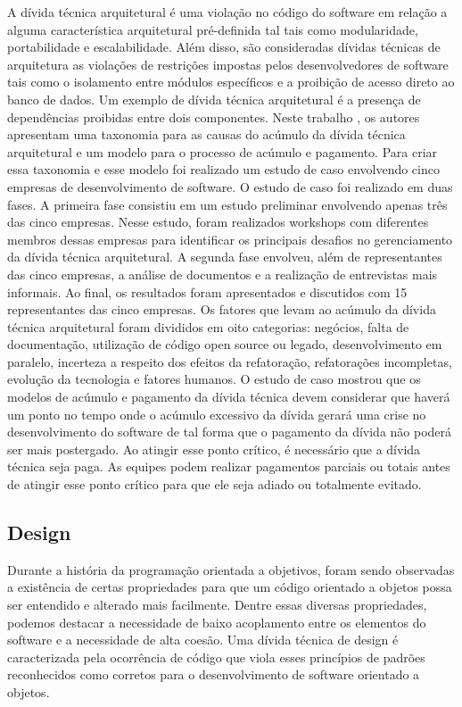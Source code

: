 A dívida técnica arquitetural é uma violação no código do software em relação a alguma característica arquitetural pré-definida tal tais como modularidade, portabilidade e escalabilidade. Além disso, são consideradas dívidas técnicas de arquitetura as violações de restrições impostas pelos desenvolvedores de software tais como o isolamento entre módulos específicos e  a proibição de acesso direto ao banco de dados.  Um exemplo de dívida técnica arquitetural é a presença de dependências proibidas entre  dois componentes. Neste trabalho \cite{martini2014architecture}, os autores apresentam uma taxonomia para as causas do acúmulo da dívida técnica arquitetural e um modelo para o processo de acúmulo e pagamento. Para criar essa taxonomia e esse modelo foi realizado um estudo de caso envolvendo cinco empresas de desenvolvimento de software.  O estudo de caso foi realizado em duas fases. A primeira fase consistiu em um estudo preliminar envolvendo apenas três das cinco empresas. Nesse estudo, foram realizados workshops com diferentes membros dessas empresas para identificar os principais desafios no gerenciamento da dívida técnica arquitetural. A segunda fase envolveu, além de representantes das cinco empresas, a análise de documentos e a realização de entrevistas mais informais. Ao final, os resultados foram apresentados e discutidos com 15 representantes das cinco empresas. Os fatores que levam ao acúmulo da dívida técnica arquitetural foram divididos em oito categorias: negócios, falta de documentação, utilização de código open source ou legado, desenvolvimento em paralelo, incerteza a respeito dos efeitos da refatoração, refatorações incompletas, evolução da tecnologia e fatores humanos. O estudo de caso mostrou que os modelos de acúmulo e pagamento da dívida técnica devem considerar que haverá um ponto no tempo onde o acúmulo excessivo da dívida gerará uma crise  no desenvolvimento do software de tal forma que o pagamento da dívida não poderá ser mais postergado. Ao atingir esse ponto crítico, é necessário que a dívida técnica seja paga. As equipes podem realizar pagamentos parciais ou totais antes de atingir esse ponto crítico para que ele seja adiado ou totalmente evitado. 


\subsection{Design}
\label{tipo_td_design}

Durante a história da programação orientada a objetivos, foram sendo observadas a existência de certas propriedades para que um código orientado a objetos possa ser entendido e alterado mais facilmente.  Dentre essas diversas propriedades, podemos destacar a necessidade de baixo acoplamento entre os elementos do software e a necessidade de alta coesão. Uma dívida técnica de design é caracterizada pela ocorrência de código que viola esses princípios de padrões reconhecidos como corretos para o desenvolvimento de software orientado a objetos.  



